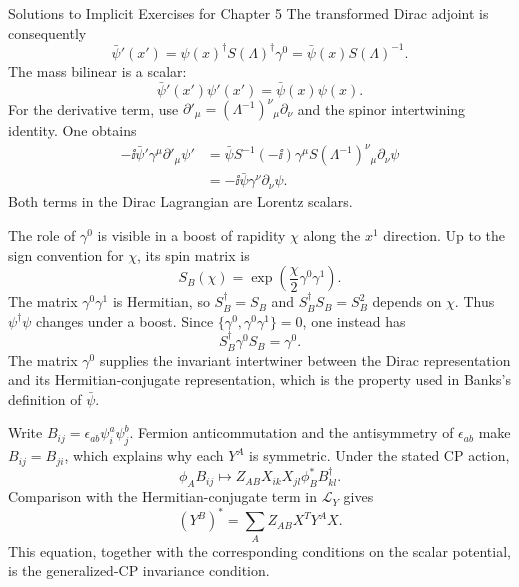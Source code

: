 \begin{bankssolutions}{Solutions to Implicit Exercises for Chapter 5}
The transformed Dirac adjoint is consequently
\begin{equation*}
  \bar\psi'(x')
  =\psi(x)^\dagger S(\Lambda)^\dagger\gamma^0
  =\bar\psi(x)S(\Lambda)^{-1}.
\end{equation*}
The mass bilinear is a scalar:
\begin{equation*}
  \bar\psi'(x')\psi'(x')=\bar\psi(x)\psi(x).
\end{equation*}
For the derivative term, use
$\partial'_\mu=(\Lambda^{-1})^\nu{}_{\mu}\partial_\nu$ and the spinor
intertwining identity.  One obtains
\begin{align*}
  -\ii\bar\psi'\gamma^\mu\partial'_\mu\psi'
  &=\bar\psi S^{-1}(-\ii)\gamma^\mu S
    (\Lambda^{-1})^\nu{}_{\mu}\partial_\nu\psi\\
  &=-\ii\bar\psi\gamma^\nu\partial_\nu\psi.
\end{align*}
Both terms in the Dirac Lagrangian are Lorentz scalars.

The role of $\gamma^0$ is visible in a boost of rapidity $\chi$ along the
$x^1$ direction.  Up to the sign convention for $\chi$, its spin matrix is
\begin{equation*}
  S_B(\chi)=\exp\left(\frac\chi2\gamma^0\gamma^1\right).
\end{equation*}
The matrix $\gamma^0\gamma^1$ is Hermitian, so
$S_B^\dagger=S_B$ and $S_B^\dagger S_B=S_B^2$ depends on $\chi$.  Thus
$\psi^\dagger\psi$ changes under a boost.  Since
$\{\gamma^0,\gamma^0\gamma^1\}=0$, one instead has
\begin{equation*}
  S_B^\dagger\gamma^0S_B=\gamma^0.
\end{equation*}
The matrix $\gamma^0$ supplies the invariant intertwiner between the Dirac
representation and its Hermitian-conjugate representation, which is the
property used in Banks's definition of $\bar\psi$.

Write
$B_{ij}=\epsilon_{ab}\psi_i^a\psi_j^b$.  Fermion anticommutation and the
antisymmetry of $\epsilon_{ab}$ make $B_{ij}=B_{ji}$, which explains why each
$Y^A$ is symmetric.  Under the stated CP action,
\begin{equation*}
  \phi_A B_{ij}
  \longmapsto
  Z_{AB}X_{ik}X_{jl}\phi_B^*B_{kl}^\dagger.
\end{equation*}
Comparison with the Hermitian-conjugate term in $\mathcal L_Y$ gives
\begin{equation*}
  (Y^B)^*
  =\sum_A Z_{AB}X^T Y^A X.
\end{equation*}
This equation, together with the corresponding conditions on the scalar
potential, is the generalized-CP invariance condition.


\end{bankssolutions}
